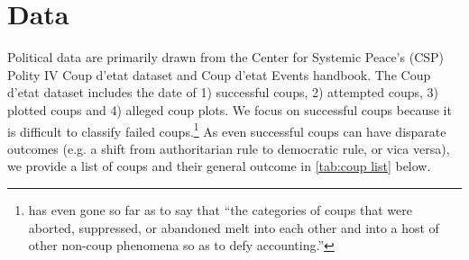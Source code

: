 \documentclass[12pt,final,fleqn]{article}
\theoremstyle{plain}
\begin{document}
\section{Data}
Political data are primarily drawn from the Center for Systemic Peace's (CSP) Polity IV Coup d'etat dataset and Coup d'etat Events handbook. The Coup d'etat dataset includes the date of 1) successful coups, 2) attempted coups, 3) plotted coups and 4) alleged coup plots. We focus on successful coups because it is difficult to classify failed coups.\footnote{\citep[p. 617]{needler1966political} has even gone so far as to say that ``the categories of coups that were aborted, suppressed, or abandoned melt into each other and into a host of other non-coup phenomena so as to defy accounting.''} As even successful coups can have disparate outcomes (e.g. a shift from authoritarian rule to democratic rule, or vica versa), we provide a list of coups and their general outcome in \autoref{tab:coup list} below. 
\end{document}
